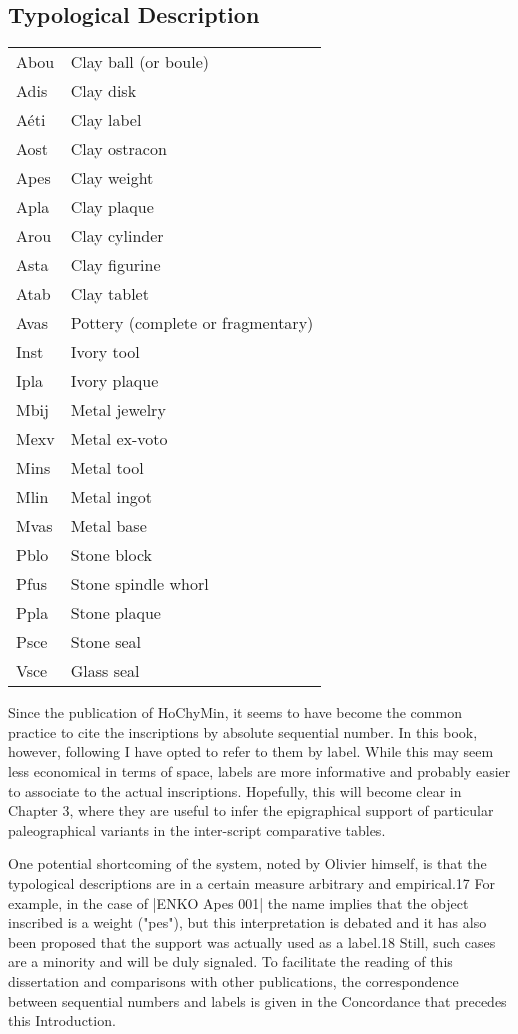 \subsection{Typological Description}


\begin{longtable}[l]{>{\ttfamily}ll}
Abou & Clay ball (or boule)\\
Adis & Clay disk\\
Aéti & Clay label\\
Aost & Clay ostracon\\
Apes & Clay weight\\
Apla & Clay plaque\\
Arou & Clay cylinder\\
Asta & Clay figurine\\
Atab & Clay tablet\\
Avas & Pottery (complete or fragmentary)\\
Inst & Ivory tool\\
Ipla & Ivory plaque\\
Mbij & Metal jewelry\\
Mexv & Metal ex-voto\\
Mins & Metal tool\\
Mlin & Metal ingot\\
Mvas & Metal base\\
Pblo & Stone block\\
Pfus & Stone spindle whorl\\
Ppla & Stone plaque\\
Psce & Stone seal\\
Vsce & Glass seal\\
\end{longtable}


Since the publication of HoChyMin, it seems to have become the common
practice to cite the inscriptions by absolute sequential number. In this book, however, following I have 
opted to refer to them by label. While this may seem less economical in terms of space,
labels are more informative and probably easier to associate to the actual inscriptions.
Hopefully, this will become clear in Chapter 3, where they are useful to infer the
epigraphical support of particular paleographical variants in the inter-script comparative
tables.

One potential shortcoming of the system, noted by Olivier himself, is that the
typological descriptions are in a certain measure arbitrary and empirical.17 For example,
in the case of |ENKO Apes 001| the name implies that the object inscribed is a weight
("pes"), but this interpretation is debated and it has also been proposed that the support
was actually used as a label.18 Still, such cases are a minority and will be duly signaled.
To facilitate the reading of this dissertation and comparisons with other publications, the
correspondence between sequential numbers and labels is given in the Concordance that
precedes this Introduction.

